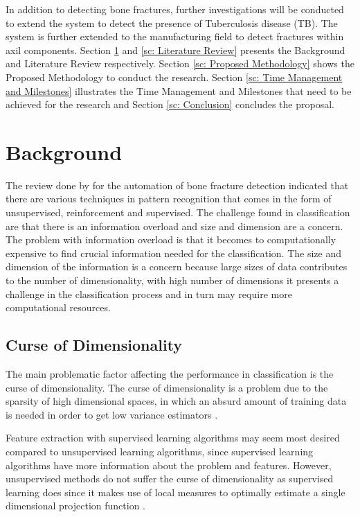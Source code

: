 \documentclass[11pt,twocolumn]{witseiepaper}
\begin{document}
	In addition to detecting bone fractures, further investigations will be conducted to extend the system to detect the presence of Tuberculosis disease (TB). The system is further extended to the manufacturing field to detect fractures within axil components. Section \ref{sc: Background} and \ref{sc: Literature Review} presents the Background and Literature Review respectively. Section \ref{sc: Proposed Methodology} shows the Proposed Methodology to conduct the research. Section \ref{sc: Time Management and Milestones} illustrates the Time Management and Milestones that need to be achieved for the research and Section \ref{sc: Conclusion} concludes the proposal.  
	
	\section{Background}
	\label{sc: Background}
	The review done by \cite{Mahendran2011} for the automation of bone fracture detection indicated that there are various techniques in pattern recognition that comes in the form of unsupervised, reinforcement and supervised. The challenge found in classification are that there is an information overload and size and dimension are a concern. The problem with information overload is that it becomes to computationally expensive to find crucial information needed for the classification. The size and dimension of the information is a concern because large sizes of data contributes to the number of dimensionality, with high number of dimensions it presents a challenge in the classification process and in turn may require more computational resources.
	
	\subsection{Curse of Dimensionality}
	The main problematic factor affecting the performance in classification is the curse of dimensionality. The curse of dimensionality is a problem due to the sparsity of high dimensional spaces, in which an absurd amount of training data is needed in order to get low variance  estimators \cite{intrator_feature_1992}.
	
	Feature extraction with supervised learning algorithms may seem most desired compared to unsupervised learning algorithms, since supervised learning algorithms have more information about the problem and features. However, unsupervised methods do not suffer the curse of dimensionality as supervised learning does since it makes use of local measures to optimally estimate a single dimensional projection function \cite{intrator_feature_1992}.
	
\end{document}
